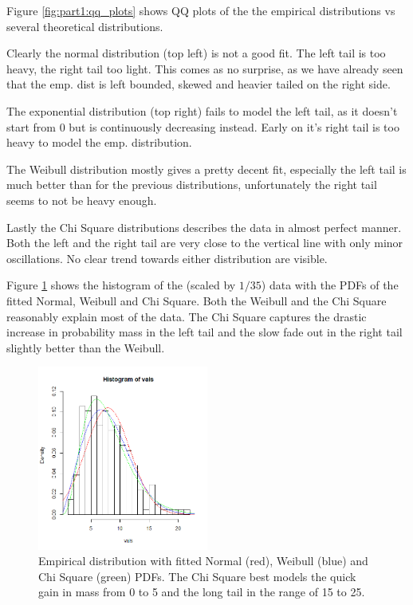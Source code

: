 \documentclass[11pt]{article}
\begin{document}
Figure \ref{fig:part1:qq_plots} shows QQ plots of the the empirical distributions vs several theoretical distributions. 

Clearly the normal distribution (top left) is not a good fit. The left tail is too heavy, the right tail too light. This comes as no surprise, as we have already seen that the emp. dist is left bounded, skewed and heavier tailed on the right side.

The exponential distribution (top right) fails to model the left tail, as it doesn't start from 0 but is continuously decreasing instead. Early on it's right tail is too heavy to model the emp. distribution.

The Weibull distribution mostly gives a pretty decent fit, especially the left tail is much better than for the previous distributions, unfortunately the right tail seems to not be heavy enough. 

Lastly the Chi Square distributions describes the data in almost perfect manner. Both the left and the right tail are very close to the vertical line with only minor oscillations. No clear trend towards either distribution are visible.

Figure \ref{fig:part1:fitted_hist} shows the histogram of the (scaled by $1/35$) data with the PDFs of the fitted Normal, Weibull and Chi Square.
Both the Weibull and the Chi Square reasonably explain most of the data. The Chi Square captures the drastic increase in probability mass in the left tail and the slow fade out in the right tail slightly better than the Weibull.







\begin{figure}[!ht]
 \center
  \includegraphics[width = 0.5\textwidth]{img/hist_chi_weibull.png}
  \caption{Empirical distribution with fitted Normal (red), Weibull (blue) and Chi Square (green) PDFs. The Chi Square best models the quick gain in mass from 0 to 5 and the long tail in the range of 15 to 25.}
  \label{fig:part1:fitted_hist}
\end{figure}
\end{document}
